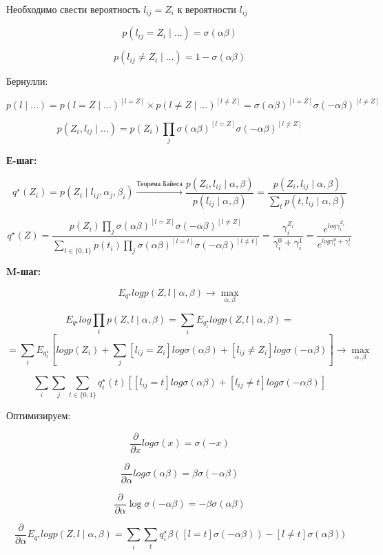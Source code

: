 \documentclass[a4paper, 12pt]{article}
\begin{document}
Необходимо свести вероятность $l_{ij} = Z_i$ к вероятности $l_{ij}$

\[p(l_{ij} = Z_i \mid \ldots) = \sigma(\alpha\beta)\]

\[p(l_{ij} \neq Z_i \mid \ldots) = 1 - \sigma(\alpha\beta)\]

Бернулли:

\[p(l \mid \ldots) = p(l = Z \mid \ldots)^{[l = Z]} 
\times p(l \neq Z \mid \ldots)^{[l \neq Z]} =
\sigma(\alpha\beta)^{[l = Z]}\sigma(-\alpha\beta)^{[l \neq Z]}\]

\[p(Z_i, l_{ij} \mid \ldots) = 
p(Z_i)\prod_{j}\sigma(\alpha\beta)^{[l = Z]}
\sigma(-\alpha\beta)^{[l \neq Z]}\]

\textbf{Е-шаг:}

\[q^{\star}(Z_i) = p(Z_i \mid l_{ij}, \alpha_j, \beta_i) 
\xrightarrow{\textrm{Теорема Байеса}} \frac{p(Z_i, l_{ij}\mid\alpha,\beta)}
{p(l_{ij}\mid\alpha,\beta)} = \frac{p(Z_i, l_{ij}\mid\alpha,\beta)}
{\sum_{t} p(t, l_{ij}\mid\alpha,\beta)}\]

\[q^{\star}(Z) = \frac{p(Z_i)
\prod_{j}\sigma(\alpha\beta)^{[l = Z]}
\sigma(-\alpha\beta)^{[l \neq Z]}}
{\sum_{t \in \{0, 1\}} p(t_i)
\prod_{j}\sigma(\alpha\beta)^{[l = t]}
\sigma(-\alpha\beta)^{[l \neq t]}} 
= \frac{\gamma^{Z_i}_i}{\gamma^{0}_i + \gamma^{1}_i} = 
\frac{e^{log\gamma^{Z_i}_i}}
{e^{log\gamma^{0}_i + \gamma^{1}_i}}\]

\textbf{M-шаг:}

\[E_{q^{\star}} log p(Z, l \mid \alpha, \beta) 
\rightarrow \max_{\alpha, \beta}\]

\[E_{q^{\star}} log \prod_i p(Z, l \mid \alpha, \beta) = 
\sum_i E_{q^{\star}_i} logp(Z, l \mid \alpha, \beta) = \]
\[=\sum_i E_{q^{\star}_i}[logp(Z_i) + 
\sum_j [l_{ij} = Z_i] log \sigma(\alpha\beta) + 
[l_{ij} \neq Z_i] log \sigma(-\alpha\beta)] 
\rightarrow \max_{\alpha, \beta}\]

\[\sum_i \sum_j \sum_{t \in \{0, 1\}} 
q_i^{\star}(t)[[l_{ij} = t] log \sigma(\alpha\beta) + 
[l_{ij} \neq t] log \sigma(-\alpha\beta)]\]

Оптимизируем:

\[\frac{\partial}{\partial x} log\sigma(x) = \sigma(-x)\]

\[\frac{\partial}{\partial \alpha}
log\sigma(\alpha\beta)= 
\beta\sigma(-\alpha\beta)\]

\[\frac{\partial}{\partial \alpha} \log\sigma(-\alpha\beta) = 
-\beta\sigma(\alpha\beta)\]

\[\frac{\partial}{\partial \alpha} E_{q^{\star}} 
log p(Z, l \mid \alpha, \beta) = 
\sum_i \sum_t q_i^{\star} \beta ([l = t]\sigma(-\alpha\beta)) - 
[l \neq t]\sigma(\alpha\beta))\]
\end{document}
